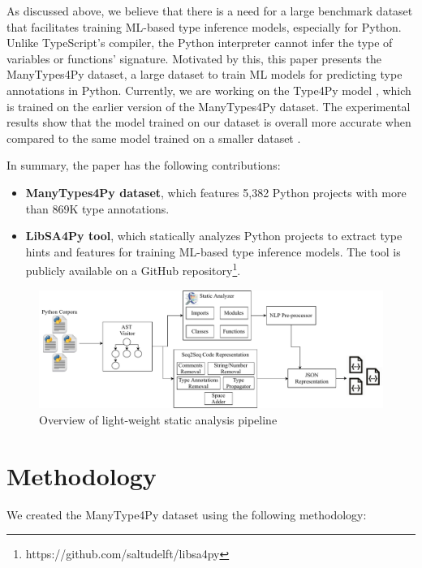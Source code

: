 \documentclass[10pt, conference]{IEEEtran}
\begin{document}
As discussed above, we believe that there is a need for a large benchmark dataset that facilitates training ML-based type inference models, especially for Python. Unlike TypeScript's compiler, the Python interpreter cannot infer the type of variables or functions' signature. Motivated by this, this paper presents the ManyTypes4Py dataset, a large dataset to train ML models for predicting type annotations in Python. Currently, we are working on the Type4Py model \cite{mir2021type4py}, which is trained on the earlier version of the ManyTypes4Py dataset. The experimental results show that the model trained on our dataset is overall more accurate when compared to the same model trained on a smaller dataset \cite{mir2021type4py}.

In summary, the paper has the following contributions:
\begin{itemize}
	\item \textbf{ManyTypes4Py dataset}, which features 5,382 Python projects with more than 869K type annotations.
	\item \textbf{LibSA4Py tool}, which statically analyzes Python projects to extract type hints and features for training ML-based type inference models. The tool is publicly available on a GitHub repository\footnote{https://github.com/saltudelft/libsa4py}.
\end{itemize}


\begin{figure}[!t]
	\centering
	\includegraphics[width=\linewidth]{figs/manytypes4py-pipeline.pdf}
	\caption{Overview of light-weight static analysis pipeline}
	\label{fig:overview-pipeline-sa}
\end{figure}

\section{Methodology}\label{sec:method}
We created the ManyType4Py dataset using the following methodology:
\end{document}
